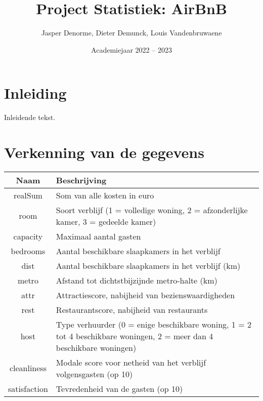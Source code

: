 \documentclass[a4paper,kulak]{kulakarticle} %
\date{Academiejaar 2022 -- 2023}
\title{Project Statistiek: AirBnB}
\author{Jasper Denorme, Dieter Demunck, Louis Vandenbruwaene}
\begin{document}
	
	\maketitle
	
	\section*{Inleiding}
	
	Inleidende tekst.
	
	\section{Verkenning van de gegevens}
	
	\begin{tabular}{c|p{10cm}}
		
		\raggedright
		Naam & Beschrijving\\
		\hline
		
		realSum & Som van alle kosten in euro\\ 
		room & Soort verblijf (1 = volledige woning, 2 = afzonderlijke kamer, 
		3 = gedeelde kamer) \\ 
		capacity & Maximaal aantal gasten \\
		bedrooms & Aantal beschikbare slaapkamers in het verblijf \\
		dist & Aantal beschikbare slaapkamers in het verblijf (km) \\
		metro & Afstand tot dichtstbijzijnde metro-halte (km)\\
		attr & Attractiescore, nabijheid van bezienswaardigheden \\
		rest & Restaurantscore, nabijheid van restaurants \\ 
		host & Type verhuurder (0 = enige beschikbare woning, 1 = 2 tot 4 beschikbare woningen,
		2 = meer dan 4 beschikbare woningen) \\ 
		cleanliness & Modale score voor netheid van het verblijf volgensgasten (op 10) \\
		
		satisfaction & Tevredenheid van de gasten (op 10)\\
		
		
	\end{tabular}
	\vspace{1cm}
	
\end{document}

